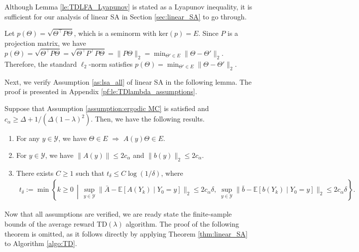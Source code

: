 \documentclass[11 pt]{article}
\begin{document}
	\begin{remark}
		Although Lemma \ref{le:TDLFA_Lyapunov} is stated as a Lyapunov inequality, it is sufficient for our analysis of linear SA in Section \ref{sec:linear_SA} to go through.
	\end{remark}
	
	
	Let $p(\Theta)=\sqrt{\Theta^\top P\Theta}$, which is a seminorm with $\text{ker}(p)=E$. Since $P$ is a projection matrix, we have $p(\Theta)=\sqrt{\Theta^\top P\Theta}=\sqrt{\Theta^\top P^\top P\Theta}=\|P\Theta\|_2=\min_{\Theta'\in E}\|\Theta-\Theta'\|_2$. Therefore, the standard $\ell_2$-norm satisfies $p(\Theta)=\min_{\Theta'\in E}\|\Theta-\Theta'\|_2$. 
	
	Next, we verify Assumption \ref{as:lsa_all} of linear SA in the following lemma. The proof is presented in Appendix \ref{pf:le:TDlambda_assumptions}. 
	
	\begin{lemma}\label{le:TDlambda_assumptions}
		Suppose that Assumption \ref{assumption:ergodic MC} is satisfied and $c_\alpha\geq \Delta+1/(\Delta(1-\lambda)^2)$. Then, we have the following results.
		\begin{enumerate}[(1)]
			\item  For any $y\in\mathcal{Y}$, we have $\Theta\in E$ $\Rightarrow$ $A(y)\Theta \in E$.
			\item For $y \in\mathcal{Y}$, we have $\|A(y)\|\leq 2c_\alpha$ and $\|b(y)\|_2\leq 2c_\alpha$.
			\item There exists $C \geq 1$ such that $t_\delta \leq C \log(1/\delta)$, where
			\begin{align*}  
				t_\delta:=\min\left\{k\geq 0\,\middle|\,\sup_{y\in\mathcal{Y}}\|\bar{A} - \mathbb{E}[A(Y_k) \mid Y_0=y]\|_2 \leq 2c_\alpha\delta, \; \sup_{y\in\mathcal{Y}}\|\bar{b}-\mathbb{E}[b(Y_k)\mid Y_0=y]\|_2 \leq 2c_\alpha\delta\right\}. 
			\end{align*}
		\end{enumerate}
	\end{lemma}
	
	Now that all assumptions are verified, we are ready state the finite-sample bounds of the average reward TD$(\lambda)$ algorithm. The proof of the following theorem is omitted, as it follows directly by applying Theorem \ref{thm:linear_SA} to Algorithm \ref{algo:TD}.
	
\end{document}
